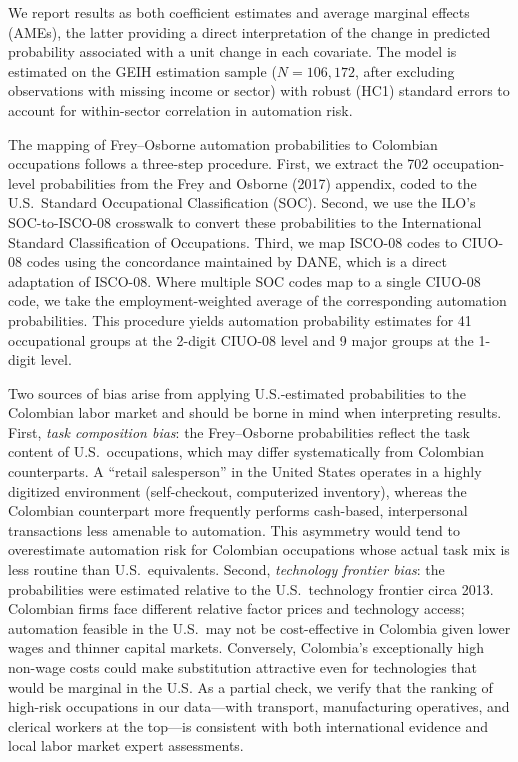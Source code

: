 \documentclass{article}
\begin{document}
We report results as both coefficient estimates and average marginal effects (AMEs), the latter providing a direct interpretation of the change in predicted probability associated with a unit change in each covariate. The model is estimated on the GEIH estimation sample ($N = 106{,}172$, after excluding observations with missing income or sector) with robust (HC1) standard errors to account for within-sector correlation in automation risk.

The mapping of Frey--Osborne automation probabilities to Colombian occupations follows a three-step procedure. First, we extract the 702 occupation-level probabilities from the Frey and Osborne (2017) appendix, coded to the U.S.\ Standard Occupational Classification (SOC). Second, we use the ILO's SOC-to-ISCO-08 crosswalk to convert these probabilities to the International Standard Classification of Occupations. Third, we map ISCO-08 codes to CIUO-08 codes using the concordance maintained by DANE, which is a direct adaptation of ISCO-08. Where multiple SOC codes map to a single CIUO-08 code, we take the employment-weighted average of the corresponding automation probabilities. This procedure yields automation probability estimates for 41 occupational groups at the 2-digit CIUO-08 level and 9 major groups at the 1-digit level.

Two sources of bias arise from applying U.S.-estimated probabilities to the Colombian labor market and should be borne in mind when interpreting results. First, \textit{task composition bias}: the Frey--Osborne probabilities reflect the task content of U.S.\ occupations, which may differ systematically from Colombian counterparts. A ``retail salesperson'' in the United States operates in a highly digitized environment (self-checkout, computerized inventory), whereas the Colombian counterpart more frequently performs cash-based, interpersonal transactions less amenable to automation. This asymmetry would tend to overestimate automation risk for Colombian occupations whose actual task mix is less routine than U.S.\ equivalents. Second, \textit{technology frontier bias}: the probabilities were estimated relative to the U.S.\ technology frontier circa 2013. Colombian firms face different relative factor prices and technology access; automation feasible in the U.S.\ may not be cost-effective in Colombia given lower wages and thinner capital markets. Conversely, Colombia's exceptionally high non-wage costs could make substitution attractive even for technologies that would be marginal in the U.S. As a partial check, we verify that the ranking of high-risk occupations in our data---with transport, manufacturing operatives, and clerical workers at the top---is consistent with both international evidence and local labor market expert assessments.
\end{document}
